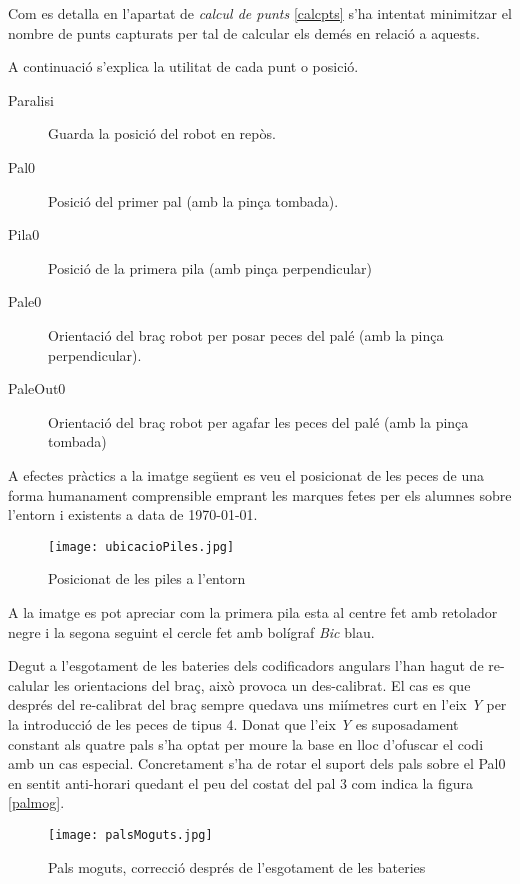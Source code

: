 Com es detalla en l'apartat de \emph{calcul de punts} \ref{calcpts}
s'ha intentat minimitzar el nombre de punts capturats per tal
de calcular els demés en relació a aquests.

A continuació s'explica la utilitat de cada punt o posició.

\begin{description}
 \item [Paralisi] Guarda la posició del robot en repòs.
 \item [Pal0] Posició del primer pal (amb la pinça tombada).
 \item [Pila0] Posició de la primera pila (amb pinça perpendicular)
 \item [Pale0] Orientació del braç robot per posar peces del palé (amb la pinça
perpendicular).
 \item [PaleOut0] Orientació del braç robot per agafar les peces del palé
(amb la pinça tombada) 
\end{description}

A efectes pràctics a la imatge següent es veu el posicionat de les peces de una forma
humanament comprensible emprant les marques fetes per els alumnes sobre l'entorn i existents
a data de \today. 

\begin{figure}[H]
\begin{center}\label{fig:palmog}
 \texttt{[image: ubicacioPiles.jpg]}
\end{center}
  \caption{Posicionat de les piles a l'entorn}
\end{figure}

A la imatge es pot apreciar com la primera pila esta al centre fet amb
retolador negre i la segona seguint el cercle fet amb bolígraf \emph{Bic} blau.

Degut a l'esgotament de les bateries dels codificadors
angulars l'han hagut de re-calular les orientacions del braç, això provoca un
des-calibrat. El cas es que després del re-calibrat
del braç sempre quedava uns mi\lgem ímetres curt en l'eix \emph{Y}
per la introducció de les peces de tipus 4. Donat que l'eix \emph{Y}
es suposadament constant als quatre pals s'ha optat per moure la base en lloc d'ofuscar
el codi amb un cas especial. Concretament s'ha de rotar el suport dels
pals sobre el Pal0 en sentit anti-horari quedant el peu del costat del pal 3
com indica la figura \ref{palmog}. 

\begin{figure}[H]
\begin{center}\label{fig:palmog}
 \texttt{[image: palsMoguts.jpg]}
\end{center}
  \caption{Pals moguts, correcció després de l'esgotament de les bateries}
\end{figure}

